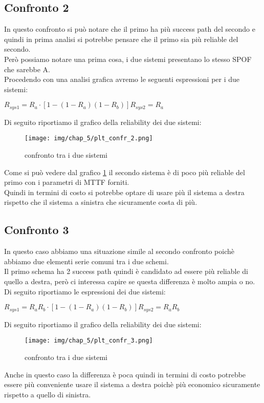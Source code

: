 \subsection{Confronto 2}
In questo confronto si può notare che il primo ha più success path del secondo e quindi in prima analisi si potrebbe pensare che il primo sia più reliable del secondo.\\
Però possiamo notare una prima cosa, i due sistemi presentano lo stesso SPOF che sarebbe A.\\
Procedendo con una analisi grafica avremo le seguenti espressioni per i due sistemi:
\begin{center}
    $
    R_{sys1} = R_a \cdot [1-(1-R_a)(1-R_b)]
    R_{sys2} = R_a
    $
\end{center}
Di seguito riportiamo il grafico della reliability dei due sistemi:
\begin{figure}[H]
    \centering
    \texttt{[image: img/chap\_5/plt\_confr\_2.png]}
    \caption{confronto tra i due sistemi}
    \label{fig:cofr2_sys}
\end{figure}
\noindent
Come si può vedere dal grafico \ref{fig:cofr2_sys} il secondo sistema è di poco più reliable del primo con i parametri di MTTF forniti.\\
Quindi in termini di costo si potrebbe optare di usare più il sistema a destra rispetto che il sistema a sinistra che sicuramente costa di più.
\subsection{Confronto 3}
In questo caso abbiamo una situazione simile al secondo confronto poichè abbiamo due elementi serie comuni tra i due schemi.\\
Il primo schema ha 2 success path quindi è candidato ad essere più reliable di quello a destra, però ci interessa capire se questa differenza è molto ampia o no.\\
Di seguito riportiamo le espressioni dei due sistemi:
\begin{center}
    $
    R_{sys1} = R_a R_b \cdot [1-(1-R_a)(1-R_b)]
    R_{sys2} = R_a R_b
    $
\end{center}
Di seguito riportiamo il grafico della reliability dei due sistemi:
\begin{figure}[H]
    \centering
    \texttt{[image: img/chap\_5/plt\_confr\_3.png]}
    \caption{confronto tra i due sistemi}
    \label{fig:cofr3_sys}
\end{figure}
\noindent
Anche in questo caso la differenza è poca quindi in termini di costo potrebbe essere più conveniente usare il sistema a destra poichè più economico sicuramente rispetto a quello di sinistra.
